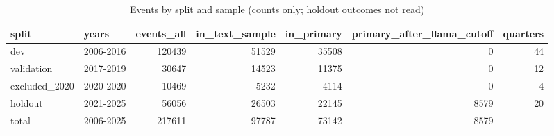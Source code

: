\begin{table}
\caption{Events by split and sample (counts only; holdout outcomes not read)}
\label{tab:cd_sample_counts}
\begin{tabular}{llrrrrr}
\toprule
split & years & events\_all & in\_text\_sample & in\_primary & primary\_after\_llama\_cutoff & quarters \\
\midrule
dev & 2006-2016 & 120439 & 51529 & 35508 & 0 & 44 \\
validation & 2017-2019 & 30647 & 14523 & 11375 & 0 & 12 \\
excluded\_2020 & 2020-2020 & 10469 & 5232 & 4114 & 0 & 4 \\
holdout & 2021-2025 & 56056 & 26503 & 22145 & 8579 & 20 \\
total & 2006-2025 & 217611 & 97787 & 73142 & 8579 &  \\
\bottomrule
\end{tabular}
\end{table}
